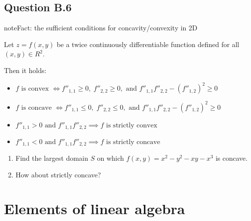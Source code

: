 \documentclass[letterpaper,10pt,english]{jupyterBook}
\begin{document}
\section{Question B.6}
\label{\detokenize{03.exercises:question-b-6}}
\begin{sphinxadmonition}{note}{Fact: the sufficient conditions for concavity/convexity in 2D}

\sphinxAtStartPar
Let \(z = f(x,y)\) be a twice continuously differentiable function defined for all
\((x, y) \in R^2\).

\sphinxAtStartPar
Then it holds:
\begin{itemize}
\item {} 
\sphinxAtStartPar
\(f \text{ is convex } \iff f''_{1,1} \ge 0, \; f''_{2,2} \ge 0 , \text{ and } f''_{1,1} f''_{2,2} − (f''_{1,2})^2 \ge 0\)

\item {} 
\sphinxAtStartPar
\(f \text{ is concave } \iff f''_{1,1} \le 0, \; f''_{2,2} \le 0 , \text{ and } f''_{1,1} f''_{2,2} − (f''_{1,2})^2 \ge 0\)

\item {} 
\sphinxAtStartPar
\(f''_{1,1} > 0 \text{ and } f''_{1,1} f''_{2,2} \implies f \text{ is strictly convex}\)

\item {} 
\sphinxAtStartPar
\(f''_{1,1} < 0 \text{ and } f''_{1,1} f''_{2,2} \implies f \text{ is strictly concave}\)

\end{itemize}
\end{sphinxadmonition}
\begin{enumerate}
%
\item {} 
\sphinxAtStartPar
Find the largest domain \(S\) on which
\(f(x, y) = x^2 − y^2 − xy − x^3\) is concave.

\item {} 
\sphinxAtStartPar
How about strictly concave?

\end{enumerate}

\sphinxstepscope


\chapter{Elements of linear algebra}
\label{\detokenize{04.linear_algebra:elements-of-linear-algebra}}\label{\detokenize{04.linear_algebra::doc}}
\end{document}
